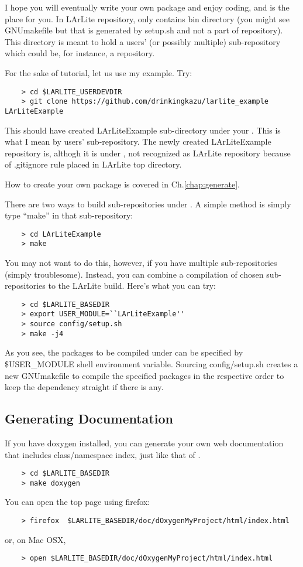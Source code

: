 I hope you will eventually write your own package and enjoy coding, and \UserDev is the place for you.
In LArLite repository, \UserDev only contains {\ttfamily bin} directory (you might see {\ttfamily GNUmakefile} but that is generated by {\ttfamily setup.sh} and not a part of repository).
This directory \UserDev is meant to hold a users' (or possibly multiple) sub-repository which could be, for instance, a \git repository.

For the sake of tutorial, let us use my example. Try:
\begin{lstlisting}
    > cd $LARLITE_USERDEVDIR
    > git clone https://github.com/drinkingkazu/larlite_example LArLiteExample
\end{lstlisting}
This should have created {\ttfamily LArLiteExample} sub-directory under your \UserDev.
This is what I mean by users' sub-repository.
The newly created {\ttfamily LArLiteExample} repository is, althogh it is under \UserDev, not recognized as
LArLite repository because of {\ttfamily .gitignore} rule placed in LArLite top directory.

How to create your own package is covered in Ch.\ref{chap:generate}.

There are two ways to build sub-repositories under \UserDev.
A simple method is simply type ``make'' in that sub-repository:
\begin{lstlisting}
    > cd LArLiteExample
    > make
\end{lstlisting}

You may not want to do this, however, if you have multiple sub-repositories (simply troublesome).
Instead, you can combine a compilation of chosen sub-repositories to the LArLite build.
Here's what you can try:
\begin{lstlisting}
    > cd $LARLITE_BASEDIR
    > export USER_MODULE=``LArLiteExample''
    > source config/setup.sh
    > make -j4
\end{lstlisting}
As you see, the packages to be compiled under \UserDev can be specified by {\ttfamily \$USER\_MODULE} shell environment variable.  
Sourcing {\ttfamily config/setup.sh} creates a new GNUmakefile to compile the specified packages in the respective order to keep the dependency straight if there is any.


\subsection{Generating Documentation}
\label{sec:gendoxygen}
If you have {\ttfamily doxygen} installed, you can generate your own web documentation that includes \CPP class/namespace index, just like that of \ROOT.
\begin{lstlisting}
    > cd $LARLITE_BASEDIR
    > make doxygen
\end{lstlisting}
You can open the top page using firefox:
\begin{lstlisting}
    > firefox  $LARLITE_BASEDIR/doc/dOxygenMyProject/html/index.html
\end{lstlisting}
or, on Mac OSX,
\begin{lstlisting}
    > open $LARLITE_BASEDIR/doc/dOxygenMyProject/html/index.html
\end{lstlisting}

